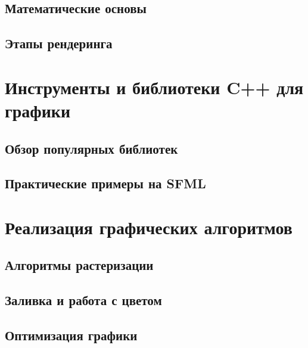 \documentclass[referat]{SCWorks}
\begin{document}
\subsection{Математические основы}


\subsection{Этапы рендеринга}



\section{Инструменты и библиотеки C++ для графики}
\subsection{Обзор популярных библиотек}

\subsection{Практические примеры на SFML}


\section{Реализация графических алгоритмов}

\subsection{Алгоритмы растеризации}


\subsection{Заливка и работа с цветом}


\subsection{Оптимизация графики}



\conclusion






\appendix

\section{}


\newpage

\section{}


\end{document}

